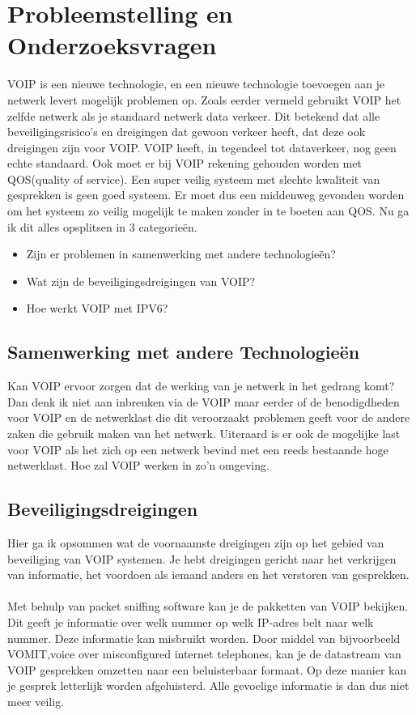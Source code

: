 \documentclass[pdftex,a4paper,12pt,twoside]{report}
\begin{document}
\newpage

\section{Probleemstelling en Onderzoeksvragen}
\label{sec:onderzoeksvragen}
VOIP is een nieuwe technologie, en een nieuwe technologie toevoegen aan je netwerk levert mogelijk problemen op. 
Zoals eerder vermeld gebruikt VOIP het zelfde netwerk als je standaard netwerk data verkeer. Dit betekend dat alle beveiligingsrisico's en dreigingen dat gewoon verkeer heeft, dat deze ook dreigingen zijn voor VOIP. VOIP heeft, in tegendeel tot dataverkeer, nog geen echte standaard. Ook moet er bij VOIP rekening gehouden worden met QOS(quality of service). Een super veilig systeem met slechte kwaliteit van gesprekken is geen goed systeem. Er moet dus een middenweg gevonden worden om het systeem zo veilig mogelijk te maken zonder in te boeten aan QOS.
Nu ga ik dit alles opsplitsen in 3 categorieën.

\begin{itemize}
	\item Zijn er problemen in samenwerking met andere technologieën?
	\item Wat zijn de beveiligingsdreigingen van VOIP?
	\item Hoe werkt VOIP met IPV6?
\end{itemize}

\subsection{Samenwerking met andere Technologieën}

Kan VOIP ervoor zorgen dat de werking van je netwerk in het gedrang komt? Dan denk ik niet aan inbreuken via de VOIP maar eerder of de benodigdheden voor VOIP en de netwerklast die dit veroorzaakt problemen geeft voor de andere zaken die gebruik maken van het netwerk. Uiteraard is er ook de mogelijke last voor VOIP als het zich op een netwerk bevind met een reeds bestaande hoge netwerklast. Hoe zal VOIP werken in zo'n omgeving.

\subsection{Beveiligingsdreigingen}
Hier ga ik opsommen wat de voornaamste dreigingen zijn op het gebied van beveiliging van VOIP systemen. Je hebt dreigingen gericht naar het verkrijgen van informatie, het voordoen als iemand anders en het verstoren van gesprekken. 
\\ \\
Met behulp van packet sniffing software kan je de pakketten van VOIP bekijken. Dit geeft je informatie over welk nummer op welk IP-adres belt naar welk nummer. Deze informatie kan misbruikt worden. Door middel van bijvoorbeeld VOMIT,voice over misconfigured internet telephones, kan je de datastream van VOIP gesprekken omzetten naar een beluisterbaar formaat. 	Op deze manier kan je gesprek letterlijk worden afgeluisterd. Alle gevoelige informatie is dan dus niet meer veilig.
\end{document}
